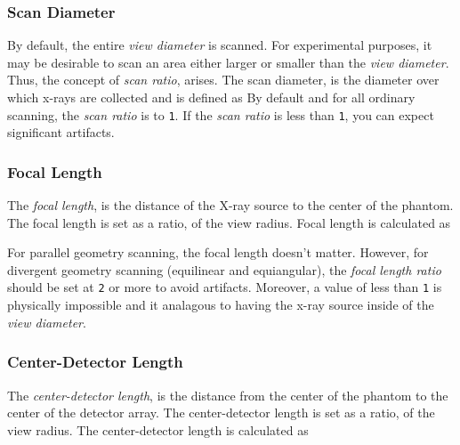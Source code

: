 \subsubsection{Scan Diameter}
By default, the entire \emph{view diameter} is scanned. For
experimental purposes, it may be desirable to scan an area either
larger or smaller than the \emph{view diameter}. Thus, the concept
of \emph{scan ratio}, 
arises. The scan diameter,
 is the diameter over
which x-rays are collected and is defined as
By default and
for all ordinary scanning, the \emph{scan ratio} is to \texttt{1}.
If the \emph{scan ratio} is less than \texttt{1}, you can expect
significant artifacts.

\subsubsection{Focal Length}
The \emph{focal length},
is the distance of the X-ray source to the center of
the phantom. The focal length is set as a ratio,
of the view radius. Focal length is
calculated as

For parallel geometry scanning, the focal length doesn't matter.
However, for divergent geometry scanning (equilinear and equiangular),
the \emph{focal length ratio} should be set at \texttt{2} or more
to avoid artifacts. Moreover, a value of less than \texttt{1} is
physically impossible and it analagous to having the x-ray
source inside of the \emph{view diameter}.

\subsubsection{Center-Detector Length}
The \emph{center-detector length},
is the distance from the center of
the phantom to the center of the detector array. The center-detector length is set as a ratio,
of the view radius. The center-detector length is
calculated as

